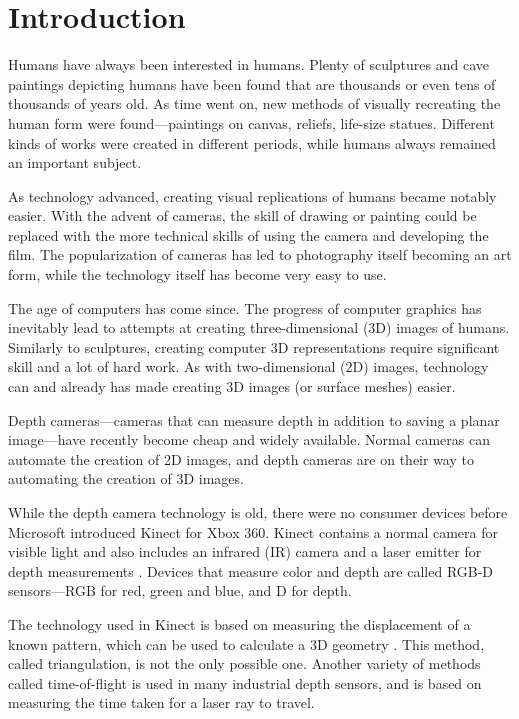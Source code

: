 \chapter{Introduction}

Humans have always been interested in humans. Plenty of sculptures and cave paintings depicting humans have been found that are thousands or even tens of thousands of years old. As time went on, new methods of visually recreating the human form were found---paintings on canvas, reliefs, life-size statues. Different kinds of works were created in different periods, while humans always remained an important subject.

As technology advanced, creating visual replications of humans became notably easier. With the advent of cameras, the skill of drawing or painting could be replaced with the more technical skills of using the camera and developing the film. The popularization of cameras has led to photography itself becoming an art form, while the technology itself has become very easy to use.

The age of computers has come since. The progress of computer graphics has inevitably lead to attempts at creating three-dimensional (3D) images of humans. Similarly to sculptures, creating computer 3D representations require significant skill and a lot of hard work. As with two-dimensional (2D) images, technology can and already has made creating 3D images (or surface meshes) easier.

Depth cameras---cameras that can measure depth in addition to saving a planar image---have recently become cheap and widely available. Normal cameras can automate the creation of 2D images, and depth cameras are on their way to automating the creation of 3D images.

While the depth camera technology is old, there were no consumer devices before Microsoft introduced Kinect for Xbox 360. Kinect contains a normal camera for visible light and also includes an infrared (IR) camera and a laser emitter for depth measurements \citep{fisher2010}. Devices that measure color and depth are called RGB-D sensors---RGB for red, green and blue, and D for depth.

The technology used in Kinect is based on measuring the displacement of a known pattern, which can be used to calculate a 3D geometry \citep{reichinger2011}. This method, called triangulation, is not the only possible one. Another variety of methods called time-of-flight is used in many industrial depth sensors, and is based on measuring the time taken for a laser ray to travel.


